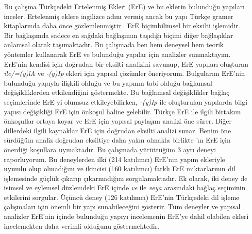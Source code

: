 Bu çalışma Türkçedeki Ertelenmiş Ekleri (ErE) ve bu eklerin bulunduğu yapıları inceler. Ertelenmiş eklere ingilizce adını \citet{geoffrey1967turkish} vermiş ancak bu yapı Türkçe gramer kitaplarında daha önce gözlemlenmiştir \citep{emre1945turk,gencan1966dilbilgisi}. ErE biçimbilimsel bir eksilti işlemidir. Bir bağlaşımda sadece en sağdaki bağlaşımın taşıdığı biçimi diğer bağlaşıklar anlamsal olarak taşımaktadır. Bu çalışmada ben hem deneysel hem teorik yöntemler kullanarak ErE ve bulunduğu yapılar için analizler sunmaktayım. ErE'nin kendisi için doğrudan bir eksilti analizini savunup, ErE yapıları oluşturan \textit{ile/=(y)lA} ve \textit{-(y)Ip} ekleri için yapısal çözümler öneriyorum. Bulgularım ErE'nin bulunduğu yapıyla ilişkili olduğu ve bu yapının tabi olduğu bağlamsal değişikliklerden etkilendiğini göstermekte. Bu bağlamsal değişiklikler bağlaç seçimlerinde ErE yi olumsuz etkileyebilirken, \textit{-(y)Ip} ile oluşturulan yapılarda bilgi yapısı değişikliği ErE için önkoşul haline gelebilir. Türkçe ErE ile ilgili \citet{kabak2007turkish} birtakım önkoşullar ortaya koyar ve \citet{orgun1995flat,kornfilt2012revisiting,broadwell2008turkish} ErE için yapısal paylaşım analizi öne sürer. Diğer dillerdeki ilgili kaynaklar \citep{guseva2017postsyntactic,erschler2018suspended} ErE için doğrudan eksilti analizi sunar. Benim öne sürdüğüm analiz doğrudan eksiltiye daha yakın olmakla birlikte \citet{kabak2007turkish}'ın ErE için önerdiği koşullara uymaktadır. Bu çalışmada yürüttüğüm 3 ayrı deneyi raporluyorum. Bu deneylerden ilki (214 katılımcı) ErE'nin yapım ekleriyle uyumlu olup olmadığını ve ikincisi (160 katılımcı) farklı ErE miktarlarının dil işlemesinde güçlük çıkarıp çıkarmadığını sorgulamaktadır. Ek olarak, iki deney de isimsel ve eylemsel düzlemdeki ErE içinde \textit{ve} ile \textit{veya} arasındaki bağlaç seçiminin etkilerini sorgular. Üçüncü deney (126 katılımcı) ErE'nin Türkçedeki dil işleme çalışmaları için önemli bir yapı sunabileceğini gösterir. Tüm deneyler ve yapısal analizler ErE'nin içinde bulunduğu yapıyı incelemenin ErE'ye dahil olabilen ekleri incelemekten daha verimli olduğunu göstermektedir.